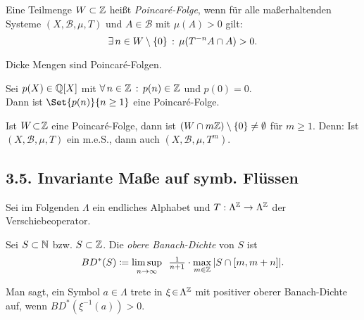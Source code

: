 \documentclass{cheat-sheet}
\newcommand{\Bor}{\mathcal{B}} %
\newcommand{\meST}{$(X, \Bor, \mu, T)$} %
\begin{document}
\begin{defn}
  Eine Teilmenge $W \subset \mathbb{Z}$ heißt \emph{Poincaré-Folge}, wenn für alle maßerhaltenden Systeme \meST{} und $A \in \Bor$ mit $\mu(A) > 0$ gilt:
  \[ \exists \, {n \in W \setminus \{ 0 \}} \,:\, \mu(T^{-n} A \cap A) > 0. \]
\end{defn}

\begin{bsp}
  Dicke Mengen sind Poincaré-Folgen.
\end{bsp}

\begin{thm}
  Sei $p(X) \in \mathbb{Q}[X]$ mit $\forall \, {n \in \mathbb{Z}} \,:\, p(n) \in \mathbb{Z}$ und $p(0) = 0$. \\
  Dann ist $\Set{p(n)}{n \geq 1}$ eine Poincaré-Folge.
\end{thm}

\begin{bem}
  Ist $W \!\subset\! \mathbb{Z}$ eine Poincaré-Folge, dann ist $(W \cap m \mathbb{Z}) \setminus \{ 0 \} \neq \emptyset$ für $m \geq 1$.
  Denn: Ist \meST{} ein m.e.S., dann auch $(X, \Bor, \mu, T^m)$.
\end{bem}

\begin{samepage}
  \section{3.5. Invariante Maße auf symb. Flüssen}
\end{samepage}

\begin{bem}
  Sei im Folgenden $\Lambda$ ein endliches Alphabet und $T : \Lambda^{\mathbb{Z}} \to \Lambda^{\mathbb{Z}}$ der Verschiebeoperator.
\end{bem}

\begin{defn}
  Sei $S \subset \mathbb{N}$ bzw. $S \subset \mathbb{Z}$. Die \emph{obere Banach-Dichte} von $S$ ist
  \[ BD^*(S) \coloneqq \limsup_{n \to \infty} \enspace \tfrac{1}{n+1} \cdot \max_{m \in \mathbb{Z}} \, \lvert S \cap \left[ m, m+n \right]\rvert. \]
\end{defn}


\begin{defn}
  Man sagt, ein Symbol $a \in \Lambda$ trete in $\xi \!\in\! \Lambda^{\mathbb{Z}}$ mit positiver oberer Banach-Dichte auf, wenn $BD^*(\xi^{-1}(a)) > 0$.
\end{defn}
\end{document}
